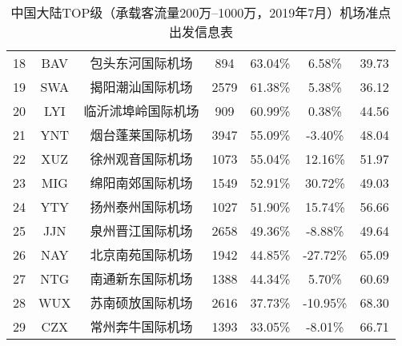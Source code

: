 \begin{table}
{\begin{tabular}{ccccccc}
            18 & BAV & 包头东河国际机场 & 894 & 63.04\% & 6.58\% & 39.73 \\
            \rowcolor[HTML]{EFEFEF}
            19 & SWA & 揭阳潮汕国际机场 & 2579 & 61.38\% & 5.38\% & 36.12 \\
            20 & LYI & 临沂沭埠岭国际机场 & 909 & 60.99\% & 0.38\% & 44.56 \\
            \rowcolor[HTML]{EFEFEF}
            21 & YNT & 烟台蓬莱国际机场 & 3947 & 55.09\% & -3.40\% & 48.04 \\
            22 & XUZ & 徐州观音国际机场 & 1073 & 55.04\% & 12.16\% & 51.97 \\
            \rowcolor[HTML]{EFEFEF}
            23 & MIG & 绵阳南郊国际机场 & 1549 & 52.91\% & 30.72\% & 49.03 \\
            24 & YTY & 扬州泰州国际机场 & 1027 & 51.90\% & 15.74\% & 56.66 \\
            \rowcolor[HTML]{EFEFEF}
            25 & JJN & 泉州晋江国际机场 & 2658 & 49.36\% & -8.88\% & 49.64 \\
            26 & NAY & 北京南苑国际机场 & 1942 & 44.85\% & -27.72\% & 65.09 \\
            \rowcolor[HTML]{EFEFEF}
            27 & NTG & 南通新东国际机场 & 1388 & 44.34\% & 5.70\% & 60.69 \\
            28 & WUX & 苏南硕放国际机场 & 2616 & 37.73\% & -10.95\% & 68.30 \\
            \rowcolor[HTML]{EFEFEF}
            29 & CZX & 常州奔牛国际机场 & 1393 & 33.05\% & -8.01\% & 66.71 \\ \hline
        \end{tabular}%
    }
    \caption{中国大陆TOP级（承载客流量200万--1000万，2019年7月）机场准点出发信息表}\label{T:depart_2_3}
\end{table}

